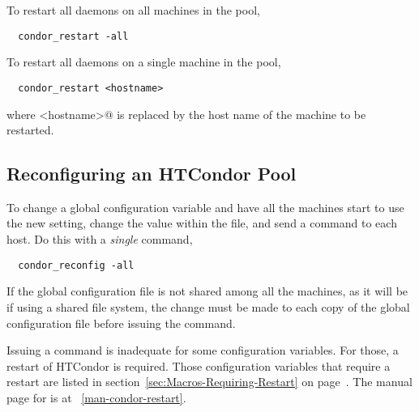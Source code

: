 \begin{description}
To restart all daemons on all machines in the pool,
\begin{verbatim}
  condor_restart -all
\end{verbatim}

To restart all daemons on a single machine in the pool,
\begin{verbatim}
  condor_restart <hostname>
\end{verbatim}
where \verb@<hostname>@ is replaced by the host name of the
machine to be restarted.

\end{description}

\subsection{\label{sec:Reconfigure-Pool}Reconfiguring an HTCondor Pool}

To change a global configuration variable and have all the
machines start to use the new setting, change the value within the file,
and send a  command to each host.
Do this with a \emph{single} command,
\begin{verbatim}
  condor_reconfig -all
\end{verbatim}

If the global configuration file is not shared among all the machines,
as it will be if using a shared file system,
the change must be made to each copy of the global configuration file
before issuing the  command.

Issuing a  command is inadequate for some
configuration variables.
For those, a restart of HTCondor is required.
Those configuration variables that require a restart are listed in
section~\ref{sec:Macros-Requiring-Restart}
on page~\pageref{sec:Macros-Requiring-Restart}.
The manual page for  is at
~\ref{man-condor-restart}.



